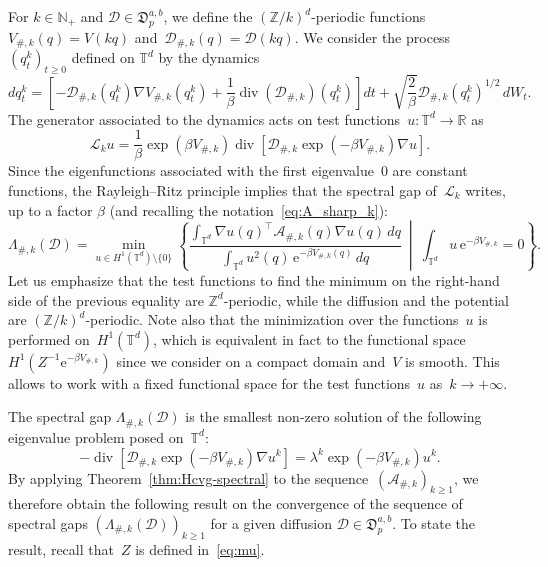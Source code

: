 \documentclass{article}
\newcommand{\dps}{\displaystyle }
\newcommand{\rme}{\mathrm{e}}
\newcommand{\R}{\mathbb{R}}
\renewcommand{\geq}{\geqslant}
\def\N{\mathbb{N}}
\def\R{\mathbb{R}}
\def\T{\mathbb{T}}
\def\Z{\mathbb{Z}}
\newcommand{\A}{\mathcal{A}}
\newcommand{\Diff}{\mathcal{D}}
\newcommand{\Diffset}{\mathfrak{D}}
\renewcommand{\dim}{d}
\begin{document}
For $k\in\N_+$ and $\Diff\in \Diffset_p^{a,b}$, we define the $(\Z/k)^\dim$-periodic functions~$V_{\#,k}(q) = V(kq)$ and~$\Diff_{\#,k}(q) = \Diff(kq)$. We consider the process $(q^k_t)_{t \geq 0}$ defined on $\T^\dim$ by the dynamics
\begin{equation}
\label{eq:dynamics-periodic}
dq^k_t = \left[-\Diff_{\#,k}(q^k_t)\nabla V_{\#,k}(q^k_t) + \frac{1}{\beta}\operatorname{div}(\Diff_{\#,k})(q^k_t)\right]dt+\sqrt{\frac{2}{\beta}}\Diff_{\#,k}(q^k_t)^{1/2}\,dW_t.
\end{equation}
The generator associated to the dynamics acts on test functions~$u:\T^\dim \to \R$ as
\[
\mathcal{L}_k u = \frac{1}{\beta} \exp\left(\beta V_{\#,k}\right) \operatorname{div}\left[\Diff_{\#,k}\exp\left(-\beta V_{\#,k}\right)\nabla u\right].
\]
Since the eigenfunctions associated with the first eigenvalue~0 are constant functions, the Rayleigh--Ritz principle implies that the spectral gap of~$\mathcal{L}_k$ writes, up to a factor $\beta$ (and recalling the notation~\eqref{eq:A_sharp_k}):
\begin{equation}
  \label{eq:lambda_per_k}
  \Lambda_{\#,k}(\Diff) = \min_{u\in H^1(\T^\dim) \setminus\{0\}} \left\{ \frac{\dps \int_{\T^\dim}\nabla u(q)^\top \A_{\#,k}(q)\nabla u(q) \, dq}{\dps \int_{\T^\dim} u^2(q) \, \rme^{-\beta V_{\#,k}(q)} \, dq} \ \middle| \ \int_{\T^\dim} u \, \rme^{-\beta V_{\#,k}} = 0 \right\}.
\end{equation}
Let us emphasize that the test functions to find the minimum on the right-hand side of the previous equality are $\Z^\dim$-periodic, while the diffusion and the potential are $(\Z/k)^\dim$-periodic. Note also that the minimization over the functions~$u$ is performed on~$H^1(\T^\dim)$, which is equivalent in fact to the functional space~$H^1(Z^{-1} \rme^{-\beta V_{\#,k}})$ since we consider on a compact domain and~$V$ is smooth. This allows to work with a fixed functional space for the test functions~$u$ as~$k \to +\infty$.

The spectral gap $\Lambda_{\#,k}(\Diff)$ is the smallest non-zero solution of the following eigenvalue problem posed on~$\T^\dim$:
\[
-\operatorname{div}\left[\Diff_{\#,k}\exp\left(-\beta V_{\#,k}\right)\nabla u^k\right]= \lambda^k \exp\left(-\beta V_{\#,k}\right)u^k.
\]
By applying Theorem~\ref{thm:Hcvg-spectral} to the sequence~$(\mathcal{A}_{\#,k})_{k\geq 1}$, we therefore obtain the following result on the convergence of the sequence of spectral gaps $\left(\Lambda_{\#,k}(\Diff)\right)_{k\geq 1}$ for a given diffusion $\Diff\in \Diffset_p^{a,b}$. To state the result, recall that~$Z$ is defined in~\eqref{eq:mu}.
\end{document}
